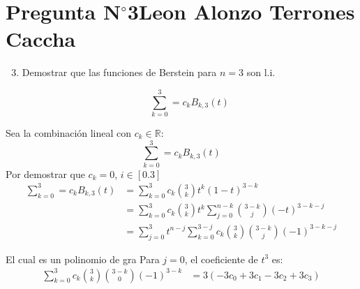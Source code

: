\section{Pregunta N$^{\circ}$3\qquad Leon Alonzo Terrones Caccha}

\begin{frame}
    \begin{enumerate}\setcounter{enumi}{2}
        \item
              Demostrar que las funciones de Berstein para $n=3$ son l.i.

              \[\sum_{k=0}^{3}=c_{k}B_{k,3}(t)\]

    \end{enumerate}

    \begin{solution}
        Sea la combinación lineal con $c_k\in\mathbb{R}:$
        \[\sum_{k=0}^{3}=c_{k}B_{k,3}(t)\]
        Por demostrar que $c_k=0$, $i\in[0.3]$
        \begin{align*}
            \sum_{k=0}^{3}=c_{k}B_{k,3}(t) & =\sum_{k=0}^{3}c_k\binom{3}{k}t^k(1-t)^{3-k}                                        \\
                                           & =\sum_{k=0}^{3}{c_k\binom{3}{k}t^k\sum_{j=0}^{n-k}\binom{3-k}{j}{(-t)^{3-k-j}}}     \\
                                           & =\sum_{j=0}^{3}{t^{n-j}\sum_{k=0}^{3-j}{c_k\binom{3}{k}\binom{3-k}{j}(-1)^{3-k-j}}}
        \end{align*}

        El cual es un polinomio de gra
        Para $j=0$, el coeficiente de $t^3$ es:
        \begin{align*}
            \sum_{k=0}^{3}{c_k\binom{3}{k}\binom{3-k}{0}(-1)^{3-k}} & =3(-3c_0+3c_1-3c_2+3c_3)
        \end{align*}
    \end{solution}
\end{frame}

